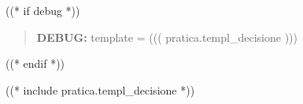 \documentclass[a4paper,12pt]{letter}
\begin{document}
\topaddr

((* if debug *))
\begin{quotation}
\textbf{DEBUG:} template = ((( pratica.templ_decisione )))
\end{quotation}
((* endif *))


((* include pratica.templ_decisione *))
\end{document}
